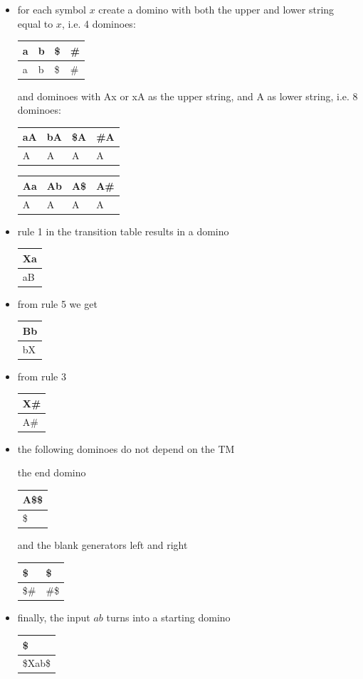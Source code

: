 \begin{itemize}
\item for each symbol $x$ create a domino with both the upper and lower string
  equal to $x$, i.e. 4 dominoes:
\begin{tabular}{|l||l||l||l|}
\hline
a & b & \$ & \# \\ \hline
a & b & \$ & \# \\
\hline
\end{tabular}
and dominoes with Ax or xA as the upper string, and A as lower
string, i.e. 8 dominoes:
\begin{tabular}{|l||l||l||l|}
\hline
aA & bA & \$A & \#A \\ \hline
A & A & A & A \\
\hline
\end{tabular}
\begin{tabular}{|l||l||l||l|}
\hline
Aa & Ab & A\$ & A\# \\ \hline
A & A & A & A \\
\hline
\end{tabular}

\item rule 1 in the transition table results in a domino
\begin{tabular}{|l|}
\hline
Xa \\ \hline
aB \\
\hline
\end{tabular}

\item from rule 5 we get
\begin{tabular}{|l|}
\hline
Bb \\ \hline
bX \\
\hline
\end{tabular}

\item
from rule 3
\begin{tabular}{|l|}
\hline
X\# \\ \hline
A\# \\
\hline
\end{tabular}


\item
the following dominoes do not depend on the TM

the end domino
\begin{tabular}{|l|}
\hline
A\$\$                     \\ \hline
   \$                     \\
\hline
\end{tabular}
and the blank generators left and right
\begin{tabular}{|l||l|}
\hline
        \$   & \$         \\ \hline
        \$\# & \#\$       \\
\hline
\end{tabular}

\item
finally, the input $ab$ turns into a starting domino
\begin{tabular}{|l|}
\hline
\$ \\ \hline
\$Xab\$ \\
\hline
\end{tabular}
\end{itemize}

